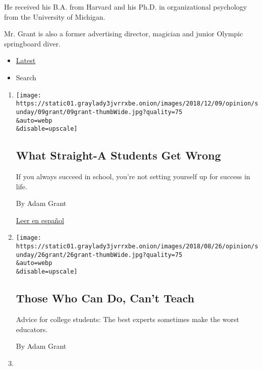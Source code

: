 He received his B.A. from Harvard and his Ph.D. in organizational
psychology from the University of Michigan.~

​Mr. Grant is also a former advertising director, magician and junior
Olympic springboard diver.

\begin{itemize}
\tightlist
\item
  \protect\hyperlink{stream-panel}{Latest}
\item
  Search
\end{itemize}

\begin{enumerate}
\def\labelenumi{\arabic{enumi}.}
\item
  \href{/2018/12/08/opinion/college-gpa-career-success.html}{}

  \texttt{[image: https://static01.graylady3jvrrxbe.onion/images/2018/12/09/opinion/sunday/09grant/09grant-thumbWide.jpg?quality=75\\\&auto=webp\\\&disable=upscale]}

  \hypertarget{what-straight-a-students-get-wrong}{%
  \subsection{What Straight-A Students Get
  Wrong}\label{what-straight-a-students-get-wrong}}

  If you always succeed in school, you're not setting yourself up for
  success in life.

  By Adam Grant

  \href{https://www.nytimes3xbfgragh.onion/es/2018/12/11/obsesion-calificaciones/?}{Leer
  en español}
\item
  \href{/2018/08/25/opinion/sunday/college-professors-experts-advice.html}{}

  \texttt{[image: https://static01.graylady3jvrrxbe.onion/images/2018/08/26/opinion/sunday/26grant/26grant-thumbWide.jpg?quality=75\\\&auto=webp\\\&disable=upscale]}

  \hypertarget{those-who-can-do-cant-teach}{%
  \subsection{Those Who Can Do, Can't
  Teach}\label{those-who-can-do-cant-teach}}

  Advice for college students: The best experts sometimes make the worst
  educators.

  By Adam Grant
\item
  \href{/2017/11/04/opinion/sunday/kids-would-you-please-start-fighting.html}{}


\end{enumerate}
